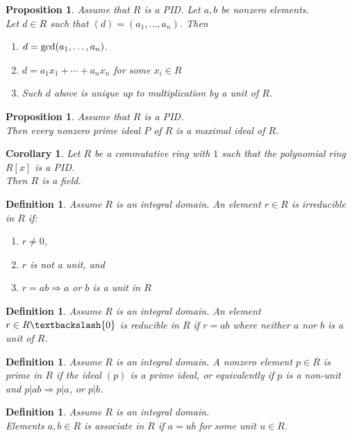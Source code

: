 \documentclass[a4paper,8pt]{article}
\newcommand{\hlt}[1]{\textit{{\color{blue}#1}}}
\newcommand{\gcds}[1]{\textnormal{gcd}#1}
\theoremstyle{theorem}
\newtheorem{corollary}[theorem]{Corollary}
\newtheorem{proposition}[theorem]{Proposition}
\newtheorem{definition}[theorem]{Definition}
\begin{document}
\begin{proposition}
Assume that $R$ is a PID. Let $a, b$ be nonzero elements.\\
Let $d \in R$ such that $(d) = (a_1, \ldots, a_n)$. Then
\begin{enumerate}[label=(\roman*)]
\item $d=\gcds(a_1, \ldots, a_n)$.
\item $d=a_1 x_1 + \cdots + a_n x_n$ for some $x_i \in R$
\item Such $d$ above is unique up to multiplication by a unit of $R$.
\end{enumerate}
\end{proposition}

\begin{proposition}
Assume that $R$ is a PID.\\
Then every nonzero prime ideal $P$ of $R$ is a maximal ideal of $R$.	
\end{proposition}

\begin{corollary}
Let $R$ be a commutative ring with $1$ such that the polynomial ring $R[x]$ is a PID.\\
Then $R$ is a field.
\end{corollary}

\begin{definition}
Assume $R$ is an integral domain. An element $r \in R$ is \hlt{irreducible} in $R$ if:
\begin{enumerate}[label=(\roman*)]
\item $r \neq 0$,
\item $r$ is not a unit, and
\item $r = ab \Rightarrow a$ or $b$ is a unit in $R$	
\end{enumerate}
\end{definition}

\begin{definition}
Assume $R$ is an integral domain. An element $r \in R \textbackslash \{0\}$ is \hlt{reducible} in $R$ if $r=ab$ where neither $a$ nor $b$ is a unit of $R$.
\end{definition}

\begin{definition}
Assume $R$ is an integral domain. A nonzero element $p \in R$ is \hlt{prime} in $R$ if the ideal $(p)$ is a prime ideal, or equivalently if $p$ is a non-unit and $p|ab \Rightarrow p|a$, or $p|b$.
\end{definition}

\begin{definition}
Assume $R$ is an integral domain.\\
Elements $a, b \in R$ is \hlt{associate} in $R$ if $a=ub$ for some unit $u \in R$.
\end{definition}
\end{document}
